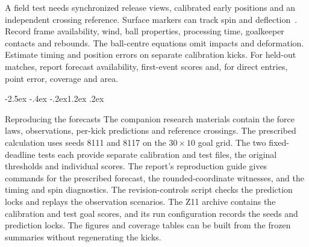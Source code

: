\documentclass[11pt,letterpaper]{article}
\makeatletter
\renewcommand{\section}{\reserveheadroom\@startsection{section}{1}{\z@}
  {-2.5ex \@plus -.4ex \@minus -.2ex}{1.2ex \@plus .2ex}
  {\normalfont\Large\bfseries\color{black}\raggedright}}
\newcommand{\reserveheadroom}{\par\ifdim\dimexpr\pagegoal-\pagetotal\relax<5\baselineskip\newpage\fi}
\makeatother
\begin{document}
A field test needs synchronized release views, calibrated early positions and an independent crossing reference. Surface markers can track spin and deflection~\cite{griffiths}. Record frame availability, wind, ball properties, processing time, goalkeeper contacts and rebounds. The ball-centre equations omit impacts and deformation. Estimate timing and position errors on separate calibration kicks. For held-out matches, report forecast availability, first-event scores and, for direct entries, point error, coverage and area.



\section{Reproducing the forecasts}
The companion research materials contain the force laws, observations, per-kick predictions and reference crossings. The prescribed calculation uses seeds 8111 and 8117 on the \(30\times10\) goal grid. The two fixed-deadline tests each provide separate calibration and test files, the original thresholds and individual scores. The report's reproduction guide gives commands for the prescribed forecast, the rounded-coordinate witnesses, and the timing and spin diagnostics. The revision-controls script checks the prediction locks and replays the observation scenarios. The Z11 archive contains the calibration and test goal scores, and its run configuration records the seeds and prediction locks. The figures and coverage tables can be built from the frozen summaries without regenerating the kicks.
\end{document}
